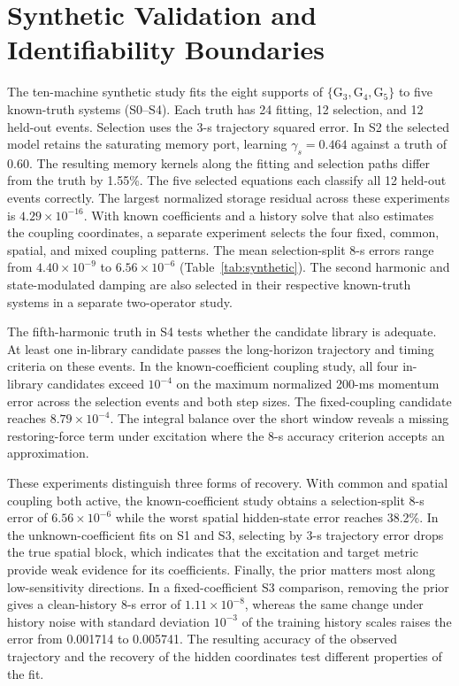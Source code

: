\documentclass[journal]{IEEEtran}
\newcommand{\op}[1]{\ensuremath{\mathrm{G}_{#1}}}
\begin{document}
\section{Synthetic Validation and Identifiability Boundaries}
\label{sec:synthetic}
The ten-machine synthetic study fits the eight supports of
\(\{\op{3},\op{4},\op{5}\}\) to five known-truth systems (S0--S4).
Each truth has 24 fitting, 12 selection, and 12 held-out events.
Selection uses the 3-s trajectory squared error. In S2 the selected
model retains the saturating memory port, learning \(\gamma_s=0.464\)
against a truth of 0.60. The resulting memory kernels along the fitting
and selection paths differ from the truth by 1.55\%. The five selected
equations each classify all 12 held-out events correctly. The largest
normalized storage residual across these experiments is
\(4.29\times10^{-16}\).
With known coefficients and a history solve that also estimates
the coupling coordinates, a separate experiment selects the four
fixed, common, spatial, and mixed coupling patterns. The mean
selection-split 8-s errors range from \(4.40\times10^{-9}\) to
\(6.56\times10^{-6}\) (Table~\ref{tab:synthetic}). The second harmonic
and state-modulated damping are also selected in their respective
known-truth systems in a separate two-operator study.
\SyntheticTable

The fifth-harmonic truth in S4 tests whether the candidate library is
adequate. At least one in-library candidate passes the long-horizon
trajectory and timing criteria on these events. In the known-coefficient
coupling study, all four in-library candidates exceed \(10^{-4}\) on the
maximum normalized 200-ms momentum error across the selection events
and both step sizes. The fixed-coupling candidate reaches
\(8.79\times10^{-4}\). The integral balance over the short window reveals a
missing restoring-force term under excitation where the 8-s accuracy
criterion accepts an approximation.

These experiments distinguish three forms of recovery. With common and
spatial coupling both active, the known-coefficient study obtains a
selection-split 8-s error of \(6.56\times10^{-6}\) while the worst
spatial hidden-state error reaches 38.2\%. In the unknown-coefficient fits
on S1 and S3, selecting by 3-s trajectory error drops the true spatial
block, which indicates that the excitation and target metric provide weak
evidence for its coefficients. Finally, the prior matters most along
low-sensitivity directions. In a fixed-coefficient S3 comparison,
removing the prior gives a clean-history 8-s error of
\(1.11\times10^{-8}\), whereas the same change under history noise with
standard deviation \(10^{-3}\) of the training history scales raises the
error from 0.001714 to 0.005741. The resulting accuracy of the observed
trajectory and the recovery of the hidden coordinates test different
properties of the fit.
\end{document}
